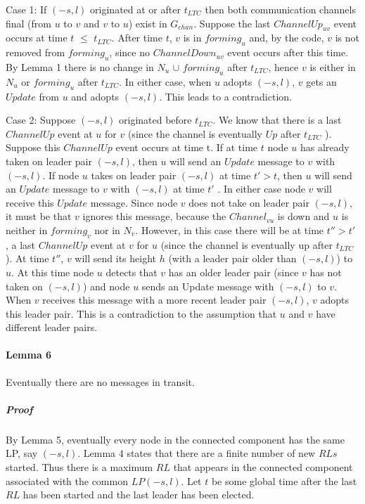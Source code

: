 Case 1: If $(-s, l)$ originated at or after $t_{LTC}$ then both communication channels final (from $u$ to $v$ and $v$ to $u$) exist in $G_{chan}$. Suppose the last $ChannelUp_{uv}$ event occurs at time $t$ $\leq$ $t_{LTC}$. After time $t$, $v$ is in $forming_u$ and, by the code, $v$ is not removed from $forming_u$, since no $ChannelDown_{uv}$ event occurs after this time. By Lemma 1 there is no change in $N_u$ $\cup$ $forming_u$ after $t_{LTC}$, hence $v$ is either in $N_u$ or $forming_u$ after $t_{LTC}$. In either case, when $u$ adopts $(-s, l)$, $v$ gets an $Update$ from $u$ and adopts $(-s, l)$. This leads to a contradiction.

Case 2: Suppose $(-s, l)$ originated before $t_{LTC}$. We know that there is a last $ChannelUp$ event at $u$ for $v$ (since the channel is eventually $Up$ after $t_{LTC}$ ). Suppose this $ChannelUp$ event occurs at time t. If at time $t$ node $u$ has already taken on leader pair $(-s, l)$, then $u$ will send an $Update$ message to $v$ with $(-s, l)$. If node $u$ takes on leader pair $(-s, l)$ at time $t'> t$, then $u$ will send an $Update$ message to $v$ with $(-s, l)$ at time $t'$ . In either case node $v$ will receive this $Update$ message. Since node $v$ does not take on leader pair $(-s, l)$, it must be that $v$ ignores this message, because the $Channel_{vu}$ is down and $u$ is neither in $forming_v$ nor in $N_v$. However, in this case there will be at time $t'' > t '$ , a last $ChannelUp$ event at $v$ for $u$ (since the channel is eventually up after $t_{LTC}$ ). At time $t''$, $v$ will send its height $h$ (with a leader pair older than $(-s, l)$) to $u$. At this time node $u$ detects that $v$ has an older leader pair (since $v$ has not taken on $(-s, l)$) and node $u$ sends an Update message with $(-s, l)$ to $v$. When $v$ receives this message with a more recent leader pair $(-s, l)$, $v$ adopts this leader pair. This is a contradiction to the assumption that $u$ and $v$ have different leader pairs.
\paragraph{Lemma 6}Eventually there are no messages in transit.
\subparagraph{Proof}By Lemma 5, eventually every node in the connected component has the same LP, say $(-s, l)$. Lemma 4 states that there are a finite number of new $RLs$ started. Thus there is a maximum $RL$ that appears in the connected component associated with the common $LP (-s, l)$. Let $t$ be some global time after the last $RL$ has been started and the last leader has been elected.

